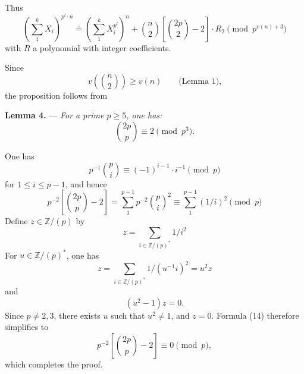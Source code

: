 \documentclass[10pt]{article}
\newcommand{\Z}{\mathbb Z}
\newcommand{\dd}{\mathrel{\doteq}}
\begin{document}
Thus
\[
\left(\sum_1^k X_i\right)^{p^l\cdot n}
\dd
\left(\sum_1^k X_i^{p^l}\right)^n
+\binom n2\left[\binom{2p}{2}-2\right]\cdot R_2
\pmod {p^{v(n)+3}}
\]
with $R$ a polynomial with integer coefficients.

Since
\[
v\left(\binom n2\right)\ge v(n)\qquad\text{(Lemma 1),}
\]
the proposition follows from

\par\medskip\noindent\textbf{Lemma 4.} --- \textit{For a prime $p\ge5$, one has:}
\[
\binom{2p}{p}\equiv2\pmod {p^3}.
\]

One has
\[
p^{-1}\binom pi\equiv(-1)^{i-1}\cdot i^{-1}\pmod p
\]
for $1\le i\le p-1$, and hence
\[
p^{-2}\left[\binom{2p}{p}-2\right]
=
\sum_1^{p-1}p^{-2}\binom pi^2
\equiv
\sum_1^{p-1}(1/i)^2
\pmod p \tag{14}
\]
Define $z\in\Z/(p)$ by
\[
z=\sum_{i\in\Z/(p)^*}1/i^2
\]
For $u\in\Z/(p)^*$, one has
\[
z=\sum_{i\in\Z/(p)^*}1/(u^{-1}i)^2=u^2z
\]
and
\[
(u^2-1)z=0.
\]
Since $p\ne2,3$, there exists $u$ such that $u^2\ne1$, and $z=0$. Formula (14) therefore simplifies to
\[
p^{-2}\left[\binom{2p}{p}-2\right]\equiv0\pmod p,
\]
which completes the proof.
\end{document}
